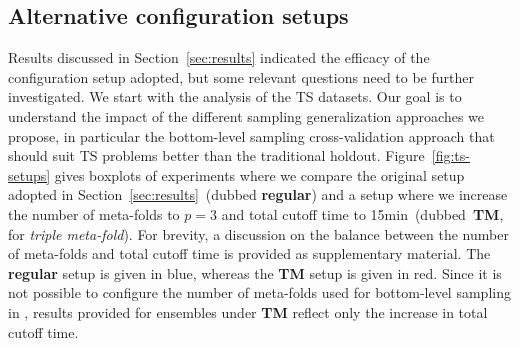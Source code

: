 
\subsection{Alternative configuration setups}
\label{sec:alt-setups}

Results discussed in Section~\ref{sec:results} indicated the efficacy of the configuration setup adopted, but some relevant questions need to be further investigated. We start with the analysis of the TS datasets. Our goal is to understand the impact of the different sampling generalization approaches we propose, in particular the bottom-level sampling cross-validation approach that should suit TS problems better than the traditional holdout.
Figure~\ref{fig:ts-setups} gives boxplots of experiments where we compare the original setup adopted in Section~\ref{sec:results}~(dubbed \textbf{regular}) and a setup where we increase the number of meta-folds to $p=3$ and total cutoff time to 15min~(dubbed~\textbf{TM}, for \textit{triple meta-fold}). For brevity, a discussion on the balance between the number of meta-folds and total cutoff time is provided as supplementary material.
%
The \textbf{regular} setup is given in blue, whereas the \textbf{TM} setup is given in red. Since it is not possible to configure the number of meta-folds used for bottom-level sampling in \autosklearn, results provided for ensembles under \textbf{TM} reflect only the increase in total cutoff time. 

